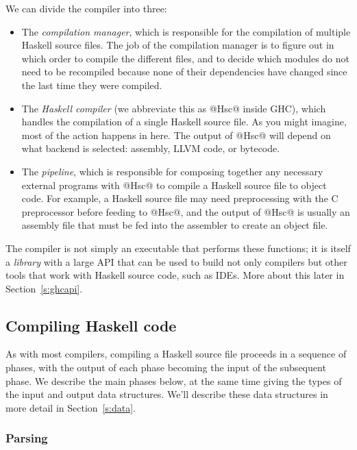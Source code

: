 \documentclass{article}
\begin{document}
We can divide the compiler into three:

\begin{itemize}
\item The \emph{compilation manager}, which is responsible for the
  compilation of multiple Haskell source files.  The job of the
  compilation manager is to figure out in which order to compile the
  different files, and to decide which modules do not need to be
  recompiled because none of their dependencies have changed since the
  last time they were compiled.

\item The \emph{Haskell compiler} (we abbreviate this as @Hsc@ inside
  GHC), which handles the compilation of a single Haskell source file.
  As you might imagine, most of the action happens in here.  The
  output of @Hsc@ will depend on what backend is selected: assembly,
  LLVM code, or bytecode.

\item The \emph{pipeline}, which is responsible for composing together
  any necessary external programs with @Hsc@ to compile a Haskell
  source file to object code.  For example, a Haskell source file may
  need preprocessing with the C preprocessor before feeding to @Hsc@,
  and the output of @Hsc@ is usually an assembly file that must be fed
  into the assembler to create an object file.
\end{itemize}

The compiler is not simply an executable that performs these
functions; it is itself a \emph{library} with a large API that can be
used to build not only compilers but other tools that work with
Haskell source code, such as IDEs.  More about this later in
Section~\ref{s:ghcapi}.

\subsection{Compiling Haskell code}

As with most compilers, compiling a Haskell source file proceeds in a
sequence of phases, with the output of each phase becoming the input
of the subsequent phase.  We describe the main phases below, at the
same time giving the types of the input and output data structures.
We'll describe these data structures in more detail in
Section~\ref{s:data}.

\subsubsection{Parsing}
\end{document}
